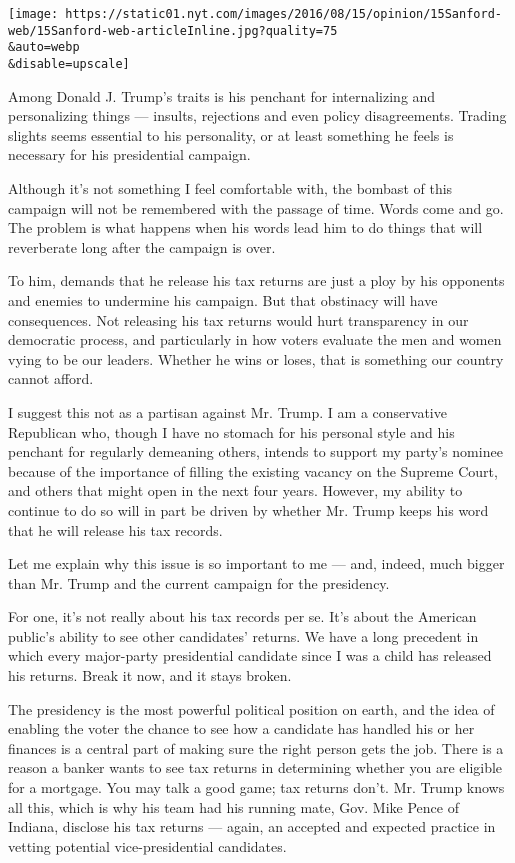 \texttt{[image: https://static01.nyt.com/images/2016/08/15/opinion/15Sanford-web/15Sanford-web-articleInline.jpg?quality=75\\\&auto=webp\\\&disable=upscale]}

Among Donald J. Trump's traits is his penchant for internalizing and
personalizing things --- insults, rejections and even policy
disagreements. Trading slights seems essential to his personality, or at
least something he feels is necessary for his presidential campaign.

Although it's not something I feel comfortable with, the bombast of this
campaign will not be remembered with the passage of time. Words come and
go. The problem is what happens when his words lead him to do things
that will reverberate long after the campaign is over.

To him, demands that he release his tax returns are just a ploy by his
opponents and enemies to undermine his campaign. But that obstinacy will
have consequences. Not releasing his tax returns would hurt transparency
in our democratic process, and particularly in how voters evaluate the
men and women vying to be our leaders. Whether he wins or loses, that is
something our country cannot afford.

I suggest this not as a partisan against Mr. Trump. I am a conservative
Republican who, though I have no stomach for his personal style and his
penchant for regularly demeaning others, intends to support my party's
nominee because of the importance of filling the existing vacancy on the
Supreme Court, and others that might open in the next four years.
However, my ability to continue to do so will in part be driven by
whether Mr. Trump keeps his word that he will release his tax records.

Let me explain why this issue is so important to me --- and, indeed,
much bigger than Mr. Trump and the current campaign for the presidency.

For one, it's not really about his tax records per se. It's about the
American public's ability to see other candidates' returns. We have a
long precedent in which every major-party presidential candidate since I
was a child has released his returns. Break it now, and it stays broken.

The presidency is the most powerful political position on earth, and the
idea of enabling the voter the chance to see how a candidate has handled
his or her finances is a central part of making sure the right person
gets the job. There is a reason a banker wants to see tax returns in
determining whether you are eligible for a mortgage. You may talk a good
game; tax returns don't. Mr. Trump knows all this, which is why his team
had his running mate, Gov. Mike Pence of Indiana, disclose his tax
returns --- again, an accepted and expected practice in vetting
potential vice-presidential candidates.


